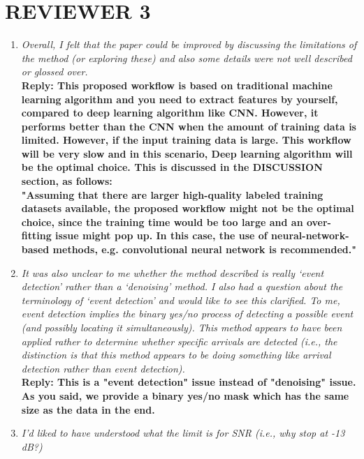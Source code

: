 \section{REVIEWER 3}
\begin{enumerate}
\item \textsl{Overall, I felt that the paper could be improved by discussing the limitations of the method (or exploring these) and also some details were not well described or glossed over. }\\

\textbf{Reply: This proposed workflow is based on traditional machine learning algorithm and you need to extract features by yourself, compared to deep learning algorithm like CNN. However, it performs better than the CNN when the amount of training data is limited. However, if the input training data is large. This workflow will be very slow and in this scenario, Deep learning algorithm will be the optimal choice.
This is discussed in the DISCUSSION section, as follows: \\
"Assuming that there are larger high-quality labeled training datasets available, the proposed workflow might not be the optimal choice, since the training time would be too large and an over-fitting issue might pop up. In this case, the use of neural-network-based methods, e.g. convolutional neural network is recommended."}\\

\item \textsl{It was also unclear to me whether the method described is really ‘event detection’ rather than a ‘denoising’ method. I also had a question about the terminology of ‘event detection’ and would like to see this clarified. To me, event detection implies the binary yes/no process of detecting a possible event (and possibly locating it simultaneously). This method appears to have been applied rather to determine whether specific arrivals are detected (i.e., the distinction is that this method appears to be doing something like arrival detection rather than event detection).}\\

\textbf{Reply: This is a "event detection" issue instead of "denoising" issue. As you said, we provide a binary yes/no mask which has the same size as the data in the end.}\\

\item \textsl{I’d liked to have understood what the limit is for SNR (i.e., why stop at -13 dB?)}\\


\end{enumerate}
